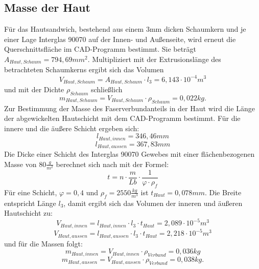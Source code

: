\subsection{Masse der Haut}
Für das Hautsandwich, bestehend aus einem 3mm dicken Schaumkern und je einer Lage Interglas 90070 auf der Innen- und Außenseite, wird erneut die Querschnittsfläche im CAD-Programm bestimmt. Sie beträgt $ A_{Haut,Schaum}=794,69mm^{2} $. Multipliziert mit der Extrusionslänge des betrachteten Schaumkerns ergibt sich das Volumen 
\begin{equation}
	V_{Haut,Schaum}=A_{Haut,Schaum}\cdot l_{3}=6,143\cdot10^{-4}m^{3}
\end{equation}
und mit der Dichte $ \rho_{Schaum} $ schließlich
\begin{equation}
	m_{Haut,Schaum}=V_{Haut,Schaum}\cdot\rho_{Schaum}=0,022kg.
\end{equation}
Zur Bestimmung der Masse des Faserverbundanteils in der Haut wird die Länge der abgewickelten Hautschicht mit dem CAD-Programm bestimmt. Für die innere und die äußere Schicht ergeben sich:
\begin{equation}
	l_{Haut,innen}=346,46mm
\end{equation}
\begin{equation}
	l_{Haut,aussen}=367,83mm
\end{equation}
Die Dicke einer Schicht des Interglas 90070 Gewebes mit einer flächenbezogenen Masse von $ 80\frac{g}{m^{2}} $
berechnet sich nach \cite{item3} mit der Formel:
\begin{equation}
	t=n\cdot\frac{m}{Lb}\cdot\frac{1}{\varphi\cdot\rho_{f}}
\end{equation}
Für eine Schicht, $ \varphi=0,4 $ und $ \rho_{f}=2550\frac{kg}{m^{3}} $ ist $ t_{Haut}=0,078mm $.
Die Breite entspricht Länge $ l_{3} $, damit ergibt sich das Volumen der inneren und äußeren Hautschicht zu:
\begin{equation}
	V_{Haut,innen}=l_{Haut,innen}\cdot l_{3}\cdot t_{Haut}=2,089\cdot 10^{-5}m^{3}
\end{equation}
\begin{equation}
	V_{Haut,aussen}=l_{Haut,aussen}\cdot l_{3}\cdot t_{Haut}=2,218\cdot 10^{-5}m^{3}
\end{equation}
und für die Massen folgt:
\begin{equation}
	m_{Haut,innen}=V_{Haut,innen}\cdot \rho_{Verbund}=0,036kg
\end{equation}
\begin{equation}
	m_{Haut,aussen}=V_{Haut,aussen}\cdot \rho_{Verbund}=0,038kg.
\end{equation}
